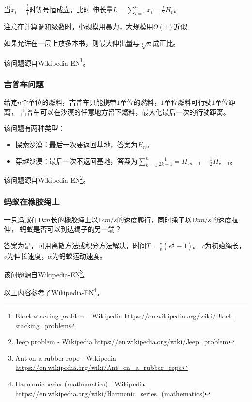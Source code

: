 当$x_i=\frac{\frac{l}{2}}{i}$时等号恒成立，此时
伸长量$\displaystyle L=\sum_{i=1}^n{x_i}=\frac{l}{2}H_n$。

注意在计算调和级数时，小规模用暴力，大规模用$O(1)$近似。

如果允许在一层上放多本书，则最大伸出量与$\sqrt[3]{n}$成正比。

该问题源自Wikipedia-EN\footnote{Block-stacking problem - Wikipedia
	\url{https://en.wikipedia.org/wiki/Block-stacking\_problem}}。
\subsubsection{吉普车问题}

给定$n$个单位的燃料，吉普车只能携带$1$单位的燃料，$1$单位燃料可行驶$1$单位距离，
吉普车可以在沙漠的任意地方留下燃料，最大化最后一次的行驶距离。

该问题有两种类型：
\begin{itemize}
    \item 探索沙漠：最后一次要返回基地，答案为$H_n$。
    \item 穿越沙漠：最后一次不返回基地，答案为$\displaystyle
    \sum_{k=1}^n{\frac{1}{2k-1}}=H_{2n-1}-\frac{1}{2}H_{n-1}$。
\end{itemize}

该问题源自Wikipedia-EN\footnote{Jeep problem - Wikipedia
	\url{https://en.wikipedia.org/wiki/Jeep\_problem}}。
\subsubsection{蚂蚁在橡胶绳上}

一只蚂蚁在$1km$长的橡胶绳上以$1cm/s$的速度爬行，同时绳子以$1km/s$的速度拉伸，
蚂蚁是否可以到达绳子的另一端？

答案为是，可用离散方法或积分方法解决，时间$T=\frac{c}{v}(e^{\frac{v}{\alpha}}-1)$。
$c$为初始绳长，$v$为伸长速度，$\alpha$为蚂蚁运动速度。

该问题源自Wikipedia-EN\footnote{Ant on a rubber rope - Wikipedia
	\url{https://en.wikipedia.org/wiki/Ant\_on\_a\_rubber\_rope}}。

以上内容参考了Wikipedia-EN\footnote{Harmonic series (mathematics) - Wikipedia
	\url{https://en.wikipedia.org/wiki/Harmonic\_series\_(mathematics)}}。

